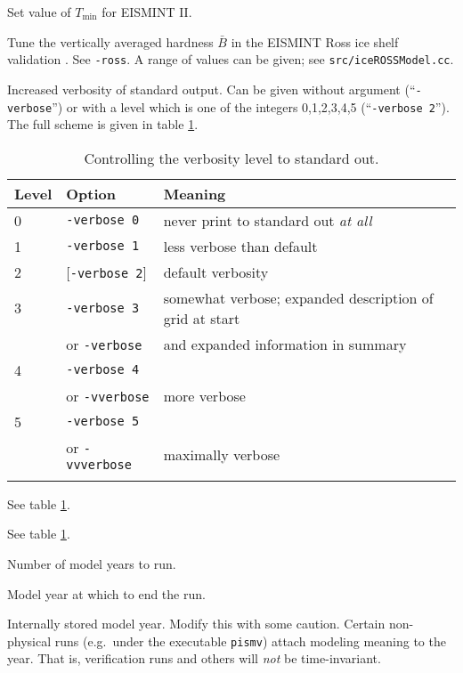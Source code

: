 \documentclass[11pt,final]{amsart}
\renewcommand{\t}[1]{\texttt{#1}}
\begin{document}
    Set value of $T_{\text{min}}$ for EISMINT II.

    Tune the vertically averaged hardness $\bar B$ in the EISMINT Ross ice shelf validation \cite{MacAyealetal}.  See \verb|-ross|.  A range of values can be given; see \verb|src/iceROSSModel.cc|.

   Increased verbosity of standard output.  Can be given without argument (``\verb|-verbose|'') or with a level which is one of the integers 0,1,2,3,4,5 (``\verb|-verbose 2|'').  The full scheme is given in table \ref{tab:verbosity}.

\begin{table}
\caption{Controlling the verbosity level to standard out.}\label{tab:verbosity}
\begin{tabular}{@{}llll}\hline
\small
\textbf{Level} & \textbf{Option} & \textbf{Meaning} \\ \hline
   0  &  \t{-verbose 0} &   never print to standard out \emph{at all}  \\
   1  &  \t{-verbose 1} &   less verbose than default  \\
   2  &  [\t{-verbose 2}] & default verbosity    \\
   3  &  \t{-verbose 3} &   somewhat verbose; expanded description of grid at start  \\
      &  or \quad \t{-verbose} &  and expanded information in summary    \\
   4  &  \t{-verbose 4} &     \\
      &  or \quad \t{-vverbose} &  more verbose    \\
   5  &  \t{-verbose 5} &     \\
      &  or \quad \t{-vvverbose} &  maximally verbose \\
\hline
\normalsize
\end{tabular}
\end{table}

   See table \ref{tab:verbosity}.

   See table \ref{tab:verbosity}.

 Number of model years to run.

 Model year at which to end the run.

  Internally stored model year.  Modify this with some caution.  Certain non-physical runs (e.g.~under the executable \verb|pismv|) attach modeling meaning to the year.  That is, verification runs and others will \emph{not} be time-invariant.
\end{document}

